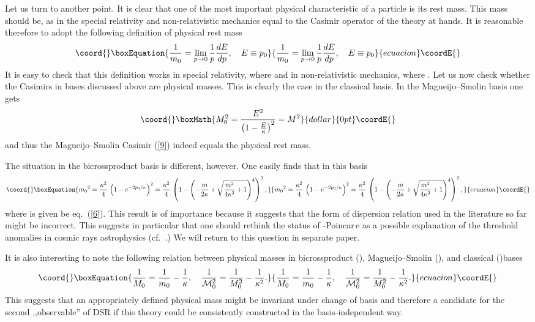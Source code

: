 \documentclass[a4paper,a4paper]{article}
\begin{document}
Let us turn to another point. It is clear that one of the most
important physical characteristic of a  particle is its rest mass.
This mass should be, as in the special relativity and
non-relativistic mechanics equal to the Casimir operator of the
theory at hands. It is reasonable therefore to adopt the following
definition of physical rest mass
\begin{equation}\coord{}\boxEquation{\label{24}
  \frac{1}{m_{0}}=\lim_{p\rightarrow0}\frac{1}{p}\frac{dE}{dp}, \quad E \equiv p_0
}{\frac{1}{m_{0}}=\lim_{p\rightarrow0}\frac{1}{p}\frac{dE}{dp}, \quad E \equiv p_0
}{ecuacion}\coordE{}\end{equation}
 It is easy to check that this definition
works in special relativity, where \coordHE{} and in
non-relativistic mechanics, where \coordHE{}. Let us now check
whether the Casimirs in bases discussed above are  physical
masses. This is clearly the case in the classical basis. In the
Magueijo--Smolin basis one gets
$$\coord{}\boxMath{
{M_0^2} = \frac{E^2}{\left(1-\frac E\kappa\right)^2} = M^2
}{dollar}{0pt}\coordE{}$$
and thus the Magueijo--Smolin Casimir (\ref{9}) indeed equals the physical rest mass.

The situation in the bicrossproduct basis is different, however. One easily finds that in this basis
\begin{equation}\coord{}\boxEquation{\label{25}
{m_{0}}^2=\frac{\kappa^2}{4}\, \left(1-e^{-2p_0/\kappa}\right)^2
=\frac{\kappa^2}{4}\, \left(1-\left(-\frac{m}{2\kappa} +
\sqrt{\frac{m^2}{4\kappa^2} +1}\right)^4\right)^2,
}{{m_{0}}^2=\frac{\kappa^2}{4}\, \left(1-e^{-2p_0/\kappa}\right)^2
=\frac{\kappa^2}{4}\, \left(1-\left(-\frac{m}{2\kappa} +
\sqrt{\frac{m^2}{4\kappa^2} +1}\right)^4\right)^2,
}{ecuacion}\coordE{}\end{equation}
where \coordHE{} is given be eq.~(\ref{6}). This result is of
importance because it suggests that the form of dispersion
relation used in the literature so far might be incorrect. This
suggests in particular that one should rethink the status of
\myHighlight{$\kappa$}\coordHE{}-Poincar\,e as a possible explanation of the threshold
anomalies in cosmic rays astrophysics (cf.~\cite{gacpir}.) We will
return to this question in separate paper.

It is also interesting to note the following relation between
physical masses in bicrossproduct (\coordHE{}), Magueijo--Smolin
(\coordHE{}), and classical (\coordHE{})bases
\begin{equation}\coord{}\boxEquation{\label{26}
  \frac1{M_0} = \frac1{m_0} - \frac1\kappa, \quad \frac1{{\cal M}^2_0} = \frac1{M^2_0} -
  \frac1{\kappa^2}.
}{\frac1{M_0} = \frac1{m_0} - \frac1\kappa, \quad \frac1{{\cal M}^2_0} = \frac1{M^2_0} -
  \frac1{\kappa^2}.
}{ecuacion}\coordE{}\end{equation}
This suggests that an appropriately defined physical mass might be
invariant under change of basis and therefore a candidate for the
second ,,observable'' of DSR if this theory could be consistently
constructed in the basis-independent way.
\end{document}
